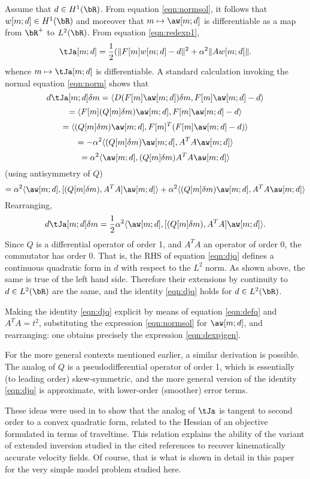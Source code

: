 Assume that $d \in H^1(\bR)$. From equation \ref{eqn:normsol}, it
follows that $w[m;d] \in H^1(\bR)$ and moreover that $m \mapsto
\aw[m;d]$ is differentiable as a map from $\bR^+$ to
$L^2(\bR)$. From equation \ref{eqn:redexp1},
\[
  \tJa[m;d] = \frac{1}{2}(\|F[m]w[m;d]-d\|^2 + \alpha^2 \|Aw[m;d]\|.
\]
whence $m \mapsto \tJa[m;d]$ is differentiable. A standard calculation
invoking the normal equation \ref{eqn:norm} shows that
\[
  d\tJa[m;d]\delta m = \langle D(F[m]\aw[m;d])\delta m, F[m]\aw[m;d]-d\rangle
\]
\[
  = \langle F[m](Q[m]\delta m)\aw[m;d], F[m]\aw[m;d]-d\rangle
\]
\[
  = \langle (Q[m]\delta m)\aw[m;d], F[m]^T(F[m]\aw[m;d]-d)\rangle
\]
\[
  = -\alpha^2\langle (Q[m]\delta m)\aw[m;d],A^TA\aw[m;d] \rangle
\]
\[
  = \alpha^2 \langle \aw[m;d], (Q[m]\delta m)A^TA \aw[m;d]\rangle
\]
(using antisymmetry of $Q$)
\[
  = \alpha^2 \langle \aw[m;d],[ (Q[m]\delta m), A^TA]\aw[m;d] \rangle
  + \alpha^2 \langle (Q[m]\delta m)\aw[m;d],A^TA\aw[m;d] \rangle
\]
Rearranging,
\begin{equation}
  \label{eqn:djq}
  d\tJa[m;d]\delta m = \frac{1}{2}\alpha^2 \langle \aw[m;d],[
  (Q[m]\delta m), A^TA]\aw[m;d] \rangle.
\end{equation}
Since $Q$ is a differential operator of order 1, and $A^TA$ an
operator of order 0, the commutator has order 0. That is, the RHS of
equation \ref{eqn:djq} defines a continuous quadratic form in $d$ with
respect to the $L^2$ norm. As shown above, the same is true of the
left hand side. Therefore their extensions by continuity to $d \in
L^2(\bR)$ are the same, and the identity \ref{eqn:djq} holds for $d
\in L^2(\bR)$.

Making the identity \ref{eqn:djq} explicit by means of equation
\ref{eqn:defq} and $A^TA = t^2$, substituting the expression
\ref{eqn:normsol} for $\aw[m;d]$, and rearranging: one obtains
precisely the expression \ref{eqn:dexpjgen}.

For the more general contexts mentioned earlier, a similar derivation
is possible. The analog of $Q$ is a pseudodifferential operator of
order 1, which is essentially (to leading order) skew-symmetric, and
the more general version of the identity \ref{eqn:djq} is approximate,
with lower-order (smoother) error terms.

These ideas were used in \cite{tenKroode:IPTA14,Symes:IPTA14} to show
that the analog of $\tJa$ is tangent to second order to a convex
quadratic form, related to the Hessian of an objective formulated in
terms of traveltime. This relation explains the ability of the variant
of extended inversion studied in the cited references to recover
kinematically accurate velocity fields. Of course, that is what is
shown in detail in this paper for the very simple model problem
studied here.
